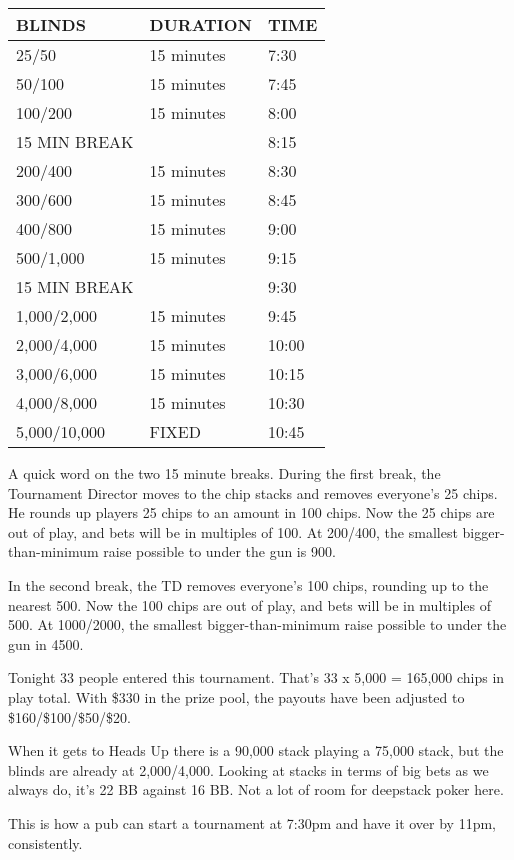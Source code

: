 \begin{tabular}{|l|l|l|} \hline
BLINDS  &  DURATION   & TIME \\ \hline
25/50   &  15 minutes & 7:30 \\ \hline
50/100  &  15 minutes & 7:45 \\ \hline
100/200 &  15 minutes & 8:00 \\ \hline
15 MIN BREAK &        & 8:15 \\ \hline
200/400 &  15 minutes & 8:30 \\ \hline
300/600 &  15 minutes & 8:45 \\ \hline
400/800 &  15 minutes & 9:00 \\ \hline
500/1,000 & 15 minutes & 9:15 \\ \hline
15 MIN BREAK  &        & 9:30 \\ \hline
1,000/2,000 & 15 minutes & 9:45 \\ \hline
2,000/4,000 & 15 minutes & 10:00 \\ \hline
3,000/6,000 & 15 minutes & 10:15 \\ \hline
4,000/8,000 & 15 minutes & 10:30 \\ \hline
5,000/10,000 & FIXED & 10:45 \\ \hline
\end{tabular}

A quick word on the two 15 minute breaks. During the first break,
the Tournament Director moves to the chip stacks and removes
everyone's 25 chips. He rounds up players 25 chips to an amount
in 100 chips. Now the 25 chips are out of play, and bets will be
in multiples of 100. At 200/400, the smallest bigger-than-minimum
raise possible to under the gun is 900.

In the second break, the TD removes everyone's 100 chips, rounding up
to the nearest 500. Now the 100 chips are out of play, and bets
will be in multiples of 500. At 1000/2000, the smallest
bigger-than-minimum raise possible to under the gun in 4500.

Tonight 33 people entered this tournament. That's 33 x 5,000 = 165,000
chips in play total. With \$330 in the prize pool, the payouts have been
adjusted to \$160/\$100/\$50/\$20.

When it gets to Heads Up there is a 90,000 stack
playing a 75,000 stack, but the blinds are already at 2,000/4,000.
Looking at stacks in terms of big bets as we always do,
it's 22 BB against 16 BB. Not a lot of room for deepstack
poker here.

This is how a pub can start a tournament at 7:30pm and have it over
by 11pm, consistently.

